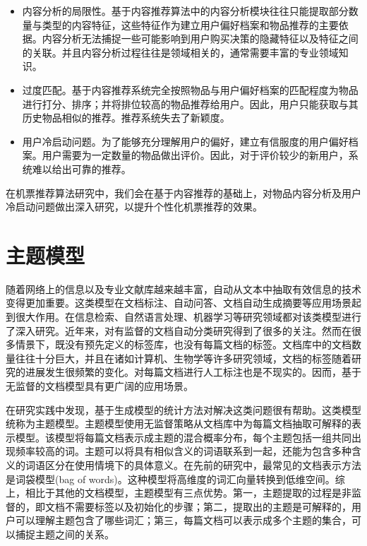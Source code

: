 \begin{itemize}
	\item 内容分析的局限性。基于内容推荐算法中的内容分析模块往往只能提取部分数量与类型的内容特征，这些特征作为建立用户偏好档案和物品推荐的主要依据。内容分析无法捕捉一些可能影响到用户购买决策的隐藏特征以及特征之间的关联。并且内容分析过程往往是领域相关的，通常需要丰富的专业领域知识。
	\item 过度匹配。基于内容推荐系统完全按照物品与用户偏好档案的匹配程度为物品进行打分、排序；并将排位较高的物品推荐给用户。因此，用户只能获取与其历史物品相似的推荐。推荐系统失去了新颖度。
	\item 用户冷启动问题。为了能够充分理解用户的偏好，建立有信服度的用户偏好档案。用户需要为一定数量的物品做出评价。因此，对于评价较少的新用户，系统难以给出可靠的推荐。
\end{itemize}

在机票推荐算法研究中，我们会在基于内容推荐的基础上，对物品内容分析及用户冷启动问题做出深入研究，以提升个性化机票推荐的效果。

\section{主题模型}

随着网络上的信息以及专业文献库越来越丰富，自动从文本中抽取有效信息的技术变得更加重要。这类模型在文档标注、自动问答、文档自动生成摘要等应用场景起到很大作用。在信息检索、自然语言处理、机器学习等研究领域都对该类模型进行了深入研究。近年来，对有监督的文档自动分类研究得到了很多的关注\parencite{yang1999evaluation}。然而在很多情景下，既没有预先定义的标签库，也没有每篇文档的标签。文档库中的文档数量往往十分巨大，并且在诸如计算机、生物学等许多研究领域，文档的标签随着研究的进展发生很频繁的变化。对每篇文档进行人工标注也是不现实的。因而，基于无监督的文档模型具有更广阔的应用场景。

在研究实践中发现，基于生成模型\parencite{zhong2005generative,hofmann1999probabilistic,blei2003latent,minka2002expectation}的统计方法对解决这类问题很有帮助。这类模型统称为主题模型。主题模型使用无监督策略从文档库中为每篇文档抽取可解释的表示模型。该模型将每篇文档表示成主题的混合概率分布，每个主题包括一组共同出现频率较高的词。主题可以将具有相似含义的词语联系到一起，还能为包含多种含义的词语区分在使用情境下的具体意义。在先前的研究中，最常见的文档表示方法是词袋模型(bag of words)\parencite{zhang2010understanding}。这种模型将高维度的词汇向量转换到低维空间。综上，相比于其他的文档模型，主题模型有三点优势。第一，主题提取的过程是非监督的，即文档不需要标签以及初始化的步骤；第二，提取出的主题是可解释的，用户可以理解主题包含了哪些词汇；第三，每篇文档可以表示成多个主题的集合，可以捕捉主题之间的关系。


